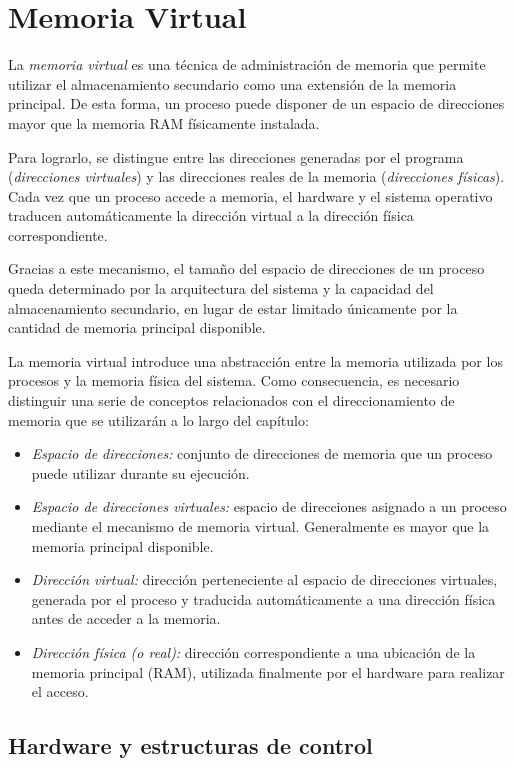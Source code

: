 \section{Memoria Virtual}

La \textit{memoria virtual} es una técnica de administración de memoria que permite utilizar el almacenamiento secundario como una extensión de la memoria principal. De esta forma, un proceso puede disponer de un espacio de direcciones mayor que la memoria RAM físicamente instalada.

Para lograrlo, se distingue entre las direcciones generadas por el programa (\emph{direcciones virtuales}) y las direcciones reales de la memoria (\emph{direcciones físicas}). Cada vez que un proceso accede a memoria, el hardware y el sistema operativo traducen automáticamente la dirección virtual a la dirección física correspondiente.

Gracias a este mecanismo, el tamaño del espacio de direcciones de un proceso queda determinado por la arquitectura del sistema y la capacidad del almacenamiento secundario, en lugar de estar limitado únicamente por la cantidad de memoria principal disponible.

La memoria virtual introduce una abstracción entre la memoria utilizada por los procesos y la memoria física del sistema. Como consecuencia, es necesario distinguir una serie de conceptos relacionados con el direccionamiento de memoria que se utilizarán a lo largo del capítulo:

\begin{itemize}
  \item \textit{Espacio de direcciones:} conjunto de direcciones de memoria que un proceso puede utilizar durante su ejecución.
  \item \textit{Espacio de direcciones virtuales:} espacio de direcciones asignado a un proceso mediante el mecanismo de memoria virtual. Generalmente es mayor que la memoria principal disponible.
  \item \textit{Dirección virtual:} dirección perteneciente al espacio de direcciones virtuales, generada por el proceso y traducida automáticamente a una dirección física antes de acceder a la memoria.
  \item \textit{Dirección física (o real):} dirección correspondiente a una ubicación de la memoria principal (RAM), utilizada finalmente por el hardware para realizar el acceso.
\end{itemize}

\subsection{Hardware y estructuras de control}


